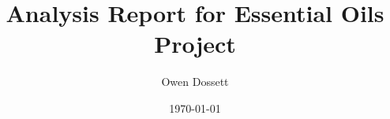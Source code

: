 \documentclass{article}
\title{Analysis Report for Essential Oils Project}
\author{Owen Dossett}
\date{\today}
\begin{document}

\section{}
\subsection{}
\end{document}
